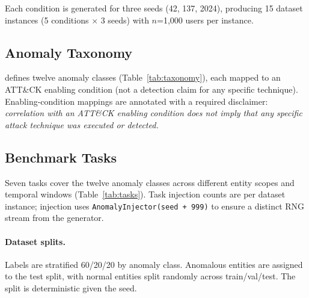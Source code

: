 Each condition is generated for three seeds (42, 137, 2024), producing 15 dataset
instances (5 conditions $\times$ 3 seeds) with $n$=1,000 users per instance.

\subsection{Anomaly Taxonomy}

\hygienebench defines twelve anomaly classes (Table~\ref{tab:taxonomy}), each
mapped to an ATT\&CK enabling condition (not a detection claim for any specific
technique). Enabling-condition mappings are annotated with a required disclaimer:
\emph{correlation with an ATT\&CK enabling condition does not imply that any
specific attack technique was executed or detected.}



\subsection{Benchmark Tasks}

Seven tasks cover the twelve anomaly classes across different entity scopes and
temporal windows (Table~\ref{tab:tasks}). Task injection counts are per dataset
instance; injection uses \texttt{AnomalyInjector(seed + 999)} to ensure a distinct
RNG stream from the generator.



\paragraph{Dataset splits.}
Labels are stratified 60/20/20 by anomaly class. Anomalous entities are assigned to
the test split, with normal entities split randomly across train/val/test. The split
is deterministic given the seed.
